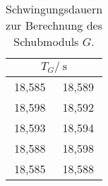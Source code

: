 \begin{table}[H]
	\centering
	\begin{tabular}{cc}
	\toprule
	\multicolumn{2}{c}{$T_G/\:\si{\second}$}\\
	\midrule
		18,585 & 18,589\\
		18,598 & 18,592\\
		18,593 & 18,594\\
		18,588 & 18,598\\
		18,585 & 18,588\\
	\bottomrule
	\end{tabular}
	\caption{Schwingungsdauern zur Berechnung des Schubmoduls $G$.}
	\label{tab:T_G}
\end{table}
